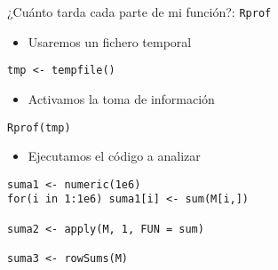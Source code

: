 \documentclass[xcolor={usenames,svgnames,dvipsnames}]{beamer}
\begin{document}
\begin{frame}[label={sec:org1582a3d},fragile]{¿Cuánto tarda cada parte de mi función?: \texttt{Rprof}}
 \begin{itemize}
\item Usaremos un fichero temporal
\end{itemize}
\lstset{language=r,label= ,caption= ,captionpos=b,numbers=none}
\begin{lstlisting}
tmp <- tempfile()
\end{lstlisting}

\begin{itemize}
\item Activamos la toma de información
\end{itemize}
\lstset{language=r,label= ,caption= ,captionpos=b,numbers=none}
\begin{lstlisting}
Rprof(tmp)
\end{lstlisting}

\begin{itemize}
\item Ejecutamos el código a analizar
\end{itemize}
\lstset{language=r,label= ,caption= ,captionpos=b,numbers=none}
\begin{lstlisting}
suma1 <- numeric(1e6)
for(i in 1:1e6) suma1[i] <- sum(M[i,])

suma2 <- apply(M, 1, FUN = sum)

suma3 <- rowSums(M)
\end{lstlisting}
\end{frame}
\end{document}
